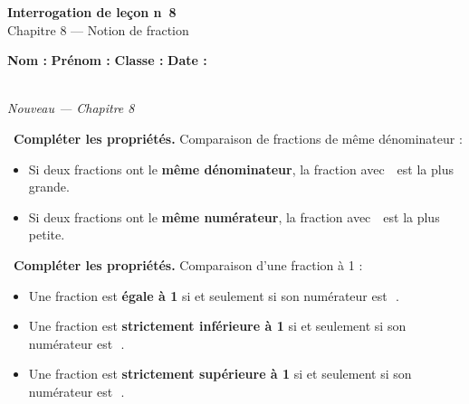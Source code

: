 \documentclass[a4paper,11pt]{article}
\newcommand{\bl}[1][4cm]{\,\makebox[#1]{\dotfill}\,}
\newcommand{\coeur}{\textcolor{Couleur8}{\faHeart}\ }
\begin{document}
\begin{mdframed}[linecolor=Couleur1,linewidth=2pt,topline=true,bottomline=true,leftline=false,rightline=false,innertopmargin=8pt,innerbottommargin=8pt,backgroundcolor=Couleur1!5]
\begin{center}
{\Large\bfseries\textcolor{Couleur1}{Interrogation de le\c{c}on n\degre~8}}\\[4pt]
{\large\textcolor{Couleur8}{Chapitre 8 --- Notion de fraction}}
\end{center}
\end{mdframed}
\vspace{0.4cm}
\noindent\textbf{Nom :} \dotfill\quad\textbf{Pr\'enom :} \dotfill\quad\textbf{Classe :} \dotfill\quad\textbf{Date :} \dotfill
\vspace{0.5cm}

\vspace{0.3cm}
\noindent{\textcolor{Couleur8}{\rule{\textwidth}{0.5pt}}}\\
{\small\textit{\textcolor{Couleur8}{Nouveau --- Chapitre 8}}}
\vspace{0.1cm}

\noindent \coeur \textbf{Compl\'eter les propri\'et\'es.} Comparaison de fractions de m\^eme d\'enominateur :
\begin{mdframed}[linecolor=Couleur1,linewidth=4pt,topline=false,bottomline=false,rightline=false,backgroundcolor=Couleur1!5,innerleftmargin=8pt,innertopmargin=6pt,innerbottommargin=6pt]
\begin{itemize}[label=\textcolor{Couleur1}{$\bullet$},nosep,itemsep=4pt]
\item Si deux fractions ont le \textbf{m\^eme d\'enominateur}, la fraction avec \bl[5cm] est la plus grande.
\item Si deux fractions ont le \textbf{m\^eme num\'erateur}, la fraction avec \bl[5cm] est la plus petite.
\end{itemize}
\end{mdframed}

\noindent \coeur \textbf{Compl\'eter les propri\'et\'es.} Comparaison d'une fraction \`a 1 :
\begin{mdframed}[linecolor=Couleur1,linewidth=4pt,topline=false,bottomline=false,rightline=false,backgroundcolor=Couleur1!5,innerleftmargin=8pt,innertopmargin=6pt,innerbottommargin=6pt]
\begin{itemize}[label=\textcolor{Couleur1}{$\bullet$},nosep,itemsep=4pt]
\item Une fraction est \textbf{\'egale \`a 1} si et seulement si son num\'erateur est \bl[4cm].
\item Une fraction est \textbf{strictement inf\'erieure \`a 1} si et seulement si son num\'erateur est \bl[4cm].
\item Une fraction est \textbf{strictement sup\'erieure \`a 1} si et seulement si son num\'erateur est \bl[4cm].
\end{itemize}
\end{mdframed}
\end{document}

